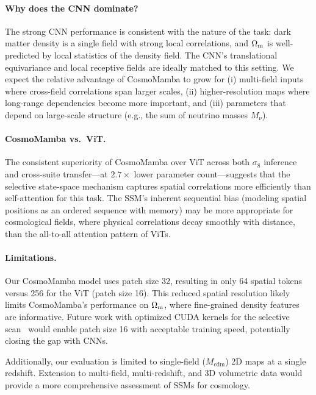 \documentclass[twocolumn,showpacs,preprintnumbers,amsmath,amssymb,aps,prd]{revtex4-2}
\newcommand{\Om}{\Omega_{\rm m}}
\newcommand{\sig}{\sigma_8}
\begin{document}
\paragraph{Why does the CNN dominate?}
The strong CNN performance is consistent with the nature of the task: dark matter density
is a single field with strong local correlations, and $\Om$ is well-predicted by local
statistics of the density field. The CNN's translational equivariance and local receptive
fields are ideally matched to this setting. We expect the relative advantage of
CosmoMamba to grow for (i) multi-field inputs where cross-field correlations span larger
scales, (ii) higher-resolution maps where long-range dependencies become more important,
and (iii) parameters that depend on large-scale structure (e.g., the sum of neutrino
masses $M_\nu$).

\paragraph{CosmoMamba vs.\ ViT.}
The consistent superiority of CosmoMamba over ViT across both $\sig$ inference and
cross-suite transfer---at $2.7\times$ lower parameter count---suggests that the selective
state-space mechanism captures spatial correlations more efficiently than self-attention
for this task. The SSM's inherent sequential bias (modeling spatial positions as an ordered
sequence with memory) may be more appropriate for cosmological fields, where physical
correlations decay smoothly with distance, than the all-to-all attention pattern of ViTs.

\paragraph{Limitations.}
Our CosmoMamba model uses patch size 32, resulting in only 64 spatial tokens versus 256
for the ViT (patch size 16). This reduced spatial resolution likely limits CosmoMamba's
performance on $\Om$, where fine-grained density features are informative. Future work
with optimized CUDA kernels for the selective scan~\cite{gu2023mamba} would enable
patch size 16 with acceptable training speed, potentially closing the gap with CNNs.

Additionally, our evaluation is limited to single-field ($M_{\text{cdm}}$) 2D maps at a
single redshift. Extension to multi-field, multi-redshift, and 3D volumetric data would
provide a more comprehensive assessment of SSMs for cosmology.


\end{document}

